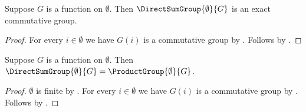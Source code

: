 \begin{proposition}\label{empty_direct_sum_group_is_exact}
    Suppose $G$ is a function on $\emptyset$.
    Then $\DirectSumGroup{\emptyset}{G}$ is an exact commutative group.
\end{proposition}
\begin{proof}
    For every $i\in\emptyset$ we have $G(i)$ is a commutative group by
        .
    Follows by .
\end{proof}

\begin{proposition}\label{empty_direct_sum_group_eq_product_group}
    Suppose $G$ is a function on $\emptyset$.
    Then
        $\DirectSumGroup{\emptyset}{G}
            =\ProductGroup{\emptyset}{G}$.
\end{proposition}
\begin{proof}
    $\emptyset$ is finite by .
    For every $i\in\emptyset$ we have $G(i)$ is a commutative group by
        .
    Follows by .
\end{proof}
